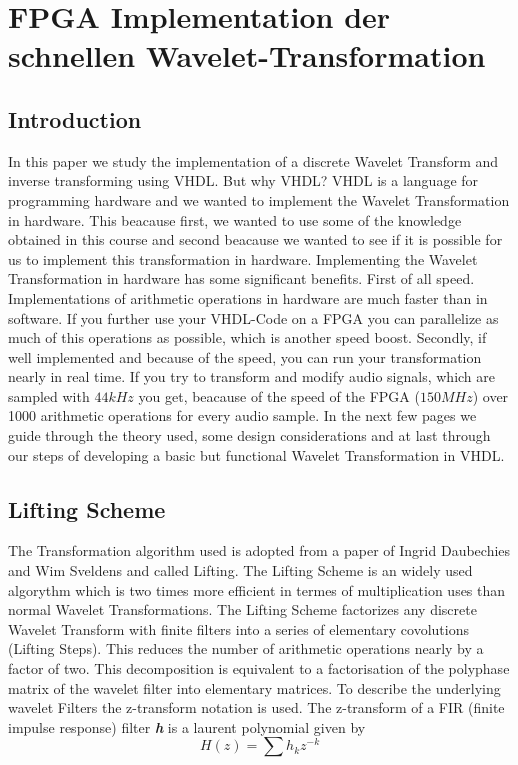 %
%
%
\chapter{FPGA Implementation der schnellen Wavelet-Transformation\label{chapter:fpga}}
\begin{refsection}

\section{Introduction}
In this paper we study the implementation of a discrete Wavelet Transform and inverse transforming using VHDL. But why VHDL? VHDL is a language for programming hardware and we wanted to implement the Wavelet Transformation in hardware. This beacause first, we wanted to use some of the knowledge obtained in this course and second beacause we wanted to see if it is possible for us to implement this transformation in hardware. Implementing the Wavelet Transformation in hardware has some significant benefits. First of all speed. Implementations of arithmetic operations in hardware are much faster than in software. If you further use your VHDL-Code on a FPGA you can parallelize as much of this operations as possible, which is another speed boost. 
Secondly, if well implemented and because of the speed, you can run your transformation nearly in real time. If you try to transform and modify audio signals, which are sampled with $44 kHz$ you get, beacause of the speed of the FPGA ($150 MHz$) over 1000 arithmetic operations for every audio sample. In the next few pages we guide through the theory used, some design considerations and at last through our steps of developing a basic but functional Wavelet Transformation in VHDL. 

\section{Lifting Scheme}

The Transformation algorithm used is adopted from a paper of Ingrid Daubechies and Wim Sveldens \cite{fpga:Daubechies1998} and called Lifting. 
The Lifting Scheme is an widely used algorythm which is two times more efficient in termes of multiplication uses than normal Wavelet Transformations. The Lifting Scheme factorizes any discrete Wavelet Transform  with finite filters into a series of elementary covolutions (Lifting Steps). This reduces the number of arithmetic operations nearly by a factor of two.
This decomposition is equivalent to a factorisation of the polyphase matrix of the wavelet filter into elementary matrices. 
To describe the underlying wavelet Filters the z-transform notation is used. The z-transform of a FIR (finite impulse response) filter \textit{\textbf{h}}  is a laurent polynomial given by
\begin{equation}\label{equ:impulse}
	H(z) = \sum h_k z^{-k}
\end{equation}


\end{refsection}
